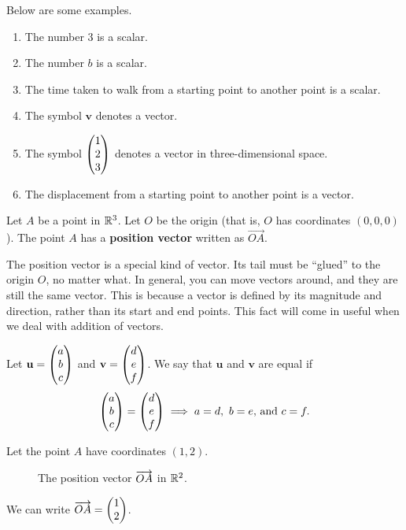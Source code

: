 \documentclass[12pt]{article}
\renewcommand{\vec}{\mathbf}
\begin{document}
\begin{eg}
	Below are some examples.
	\begin{enumerate}
		\item The number \(3\) is a scalar.
		\item The number \(b\) is a scalar.
		\item The time taken to walk from a starting point to another point is a scalar.
		\item The symbol \(\vec{v}\) denotes a vector.
		\item The symbol \(\begin{pmatrix} 1 \\ 2 \\ 3 \end{pmatrix}\) denotes a vector in three-dimensional space.
		\item The displacement from a starting point to another point is a vector.
	\end{enumerate}	
\end{eg}

\begin{defn}
	Let \(A\) be a point in \(\mathbb{R}^3\).
	Let \(O\) be the origin (that is, \(O\) has coordinates \((0,0,0)\)).
	The point \(A\) has a \textbf{position vector} written as \(\overrightarrow{OA}\).
\end{defn}

The position vector is a special kind of vector.
Its tail must be ``glued'' to the origin \(O\), no matter what.
In general, you can move vectors around, and they are still the same vector.
This is because a vector is defined by its magnitude and direction, rather than its start and end points.
This fact will come in useful when we deal with addition of vectors.

\begin{defn}
	Let \(\vec{u} = \cvec{a \\ b \\ c}\) and \(\vec{v} = \cvec{d \\ e \\ f}\).
	We say that \(\vec{u}\)	and \(\vec{v}\) are equal if 
	\[ \begin{pmatrix} a \\ b \\ c \end{pmatrix} = \begin{pmatrix} d \\ e \\ f \end{pmatrix} \implies a = d,\ b = e,\!\text{ and } c = f. \] 
\end{defn}

\begin{eg}
	Let the point \(A\) have coordinates \((1,2)\).
	\begin{figure}[H]
		\centering
		\caption{The position vector \(\protect\overrightarrow{OA}\) in \(\mathbb{R}^2\).}
		\label{fig:OA}
	\end{figure}
	We can write \(\overrightarrow{OA} = \begin{pmatrix} 1 \\ 2 \end{pmatrix}\).
\end{eg}
\end{document}
